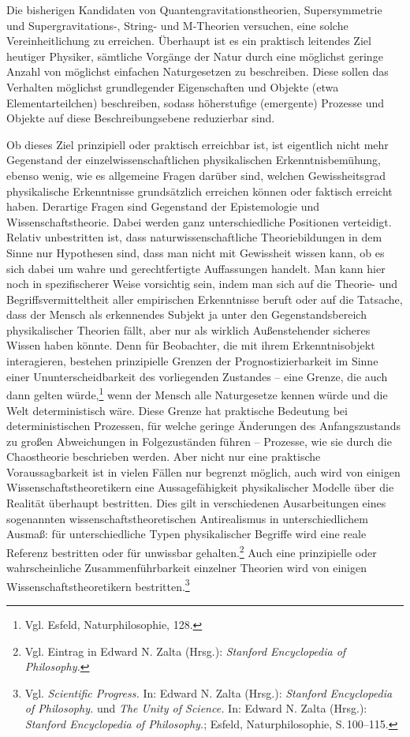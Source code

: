 \documentclass[titlepage, parkskip=full, twocolumn, landscape]{scrartcl}
\begin{document}
Die bisherigen Kandidaten von Quantengravitationstheorien, Supersymmetrie und Supergravitations-, String- und M-Theorien versuchen, eine solche Vereinheitlichung zu erreichen. Überhaupt ist es ein praktisch leitendes Ziel heutiger Physiker, sämtliche Vorgänge der Natur durch eine möglichst geringe Anzahl von möglichst einfachen Naturgesetzen zu beschreiben. Diese sollen das Verhalten möglichst grundlegender Eigenschaften und Objekte (etwa Elementarteilchen) beschreiben, sodass höherstufige (emergente) Prozesse und Objekte auf diese Beschreibungsebene reduzierbar sind.

Ob dieses Ziel prinzipiell oder praktisch erreichbar ist, ist eigentlich nicht mehr Gegenstand der einzelwissenschaftlichen physikalischen Erkenntnisbemühung, ebenso wenig, wie es allgemeine Fragen darüber sind, welchen Gewissheitsgrad physikalische Erkenntnisse grundsätzlich erreichen können oder faktisch erreicht haben. Derartige Fragen sind Gegenstand der Epistemologie und Wissenschaftstheorie. Dabei werden ganz unterschiedliche Positionen verteidigt. Relativ unbestritten ist, dass naturwissenschaftliche Theoriebildungen in dem Sinne nur Hypothesen sind, dass man nicht mit Gewissheit wissen kann, ob es sich dabei um wahre und gerechtfertigte Auffassungen handelt. Man kann hier noch in spezifischerer Weise vorsichtig sein, indem man sich auf die Theorie- und Begriffsvermitteltheit aller empirischen Erkenntnisse beruft oder auf die Tatsache, dass der Mensch als erkennendes Subjekt ja unter den Gegenstandsbereich physikalischer Theorien fällt, aber nur als wirklich Außenstehender sicheres Wissen haben könnte. Denn für Beobachter, die mit ihrem Erkenntnisobjekt interagieren, bestehen prinzipielle Grenzen der Prognostizierbarkeit im Sinne einer Ununterscheidbarkeit des vorliegenden Zustandes -- eine Grenze, die auch dann gelten würde,\footnote{Vgl. Esfeld, Naturphilosophie, 128.} wenn der Mensch alle Naturgesetze kennen würde und die Welt deterministisch wäre. Diese Grenze hat praktische Bedeutung bei deterministischen Prozessen, für welche geringe Änderungen des Anfangszustands zu großen Abweichungen in Folgezuständen führen -- Prozesse, wie sie durch die Chaostheorie beschrieben werden. Aber nicht nur eine praktische Voraussagbarkeit ist in vielen Fällen nur begrenzt möglich, auch wird von einigen Wissenschaftstheoretikern eine Aussagefähigkeit physikalischer Modelle über die Realität überhaupt bestritten. Dies gilt in verschiedenen Ausarbeitungen eines sogenannten wissenschaftstheoretischen Antirealismus in unterschiedlichem Ausmaß: für unterschiedliche Typen physikalischer Begriffe wird eine reale Referenz bestritten oder für unwissbar gehalten.\footnote{Vgl. Eintrag in Edward N. Zalta (Hrsg.): \emph{Stanford Encyclopedia of Philosophy.}} Auch eine prinzipielle oder wahrscheinliche Zusammenführbarkeit einzelner Theorien wird von einigen Wissenschaftstheoretikern bestritten.\footnote{Vgl. \emph{Scientific Progress.} In: Edward N. Zalta (Hrsg.): \emph{Stanford Encyclopedia of Philosophy.} und \emph{The Unity of Science.} In: Edward N. Zalta (Hrsg.): \emph{Stanford Encyclopedia of Philosophy.}; Esfeld, Naturphilosophie, S.\,100--115.}
\end{document}
